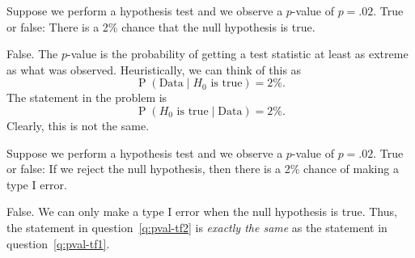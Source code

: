 \documentclass[11pt]{exam}
\DeclareMathOperator*{\Prob}{P}
\renewcommand{\Pr}{\Prob}
\begin{document}
\begin{questions}

\newpage



\question \label{q:pval-tf1} Suppose we perform a hypothesis test and we observe a $p$-value of
$p = .02$.  True or false: There is a 2\% chance that the null hypothesis is
true.

\begin{solution}
False.  The $p$-value is the probability of getting a test statistic at least
as extreme as what was observed.  Heuristically, we can think of this as
\[
  \Pr(\text{Data} \mid \text{$H_0$ is true}) = 2\%.
\]
The statement in the problem is
\[
  \Pr(\text{$H_0$ is true} \mid \text{Data}) = 2\%.
\]
Clearly, this is not the same.
\end{solution}



\question \label{q:pval-tf2} Suppose we perform a hypothesis test and we observe a $p$-value of
$p = .02$.  True or false: If we reject the null hypothesis, then there is a 2\%
chance of making a type I error. 

\begin{solution}
False.  We can only make a type I error when the null hypothesis is true.
Thus, the statement in question~\ref{q:pval-tf2} is \emph{exactly the same} as
the statement in question~\ref{q:pval-tf1}.
\end{solution}


\end{questions}
\end{document}
